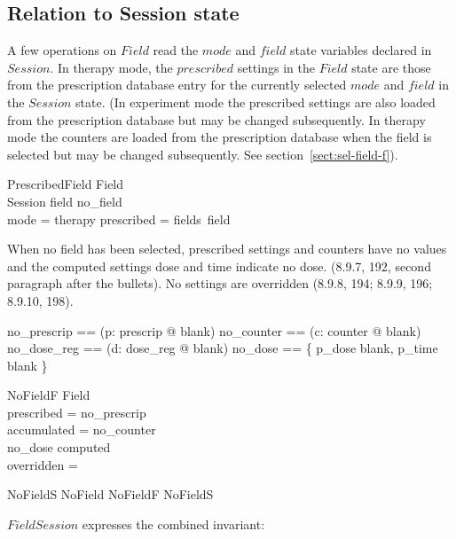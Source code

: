 \documentclass{article}
\begin{document}
\subsection{Relation to Session state}

A few operations on $Field$ read the $mode$ and $field$ state variables
declared in $Session$.  In therapy mode, the $prescribed$ settings in
the $Field$ state are those from the prescription database entry for
the currently selected $mode$ and $field$ in the $Session$ state. (In
experiment mode the prescribed settings are also loaded from the
prescription database but may be changed subsequently.  In therapy
mode the counters are loaded from the prescription database when the
field is selected but may be changed subsequently.  See
section~\ref{sect:sel-field-f}).

\begin{schema}{PrescribedField}
	Field \\
	Session
\where
	field \neq no\_field \\
	mode = therapy \implies prescribed = fields~field \\
\end{schema}
When no field has been selected, prescribed settings and counters have
no values and the computed settings dose and time indicate no dose.
(8.9.7, 192, second paragraph after the bullets).  No settings are
overridden (8.9.8, 194; 8.9.9, 196; 8.9.10, 198).

\begin{zed}
	no\_prescrip == (\lambda p: prescrip @ blank)
\also
	no\_counter == (\lambda c: counter @ blank)
\also
	no\_dose\_reg == (\lambda d: dose\_reg @ blank)
\also
	no\_dose == \{ p\_dose \mapsto blank, p\_time \mapsto blank \} 
\end{zed}

\begin{schema}{NoFieldF}
	Field \\
\where
	prescribed = no\_prescrip \\
	accumulated = no\_counter \\
	no\_dose \subseteq computed \\
	overridden = \emptyset \\
\end{schema}

\begin{zed}
	NoFieldS 
\also
	NoField  NoFieldF \land NoFieldS
\end{zed}
$FieldSession$ expresses the combined invariant:
\end{document}
